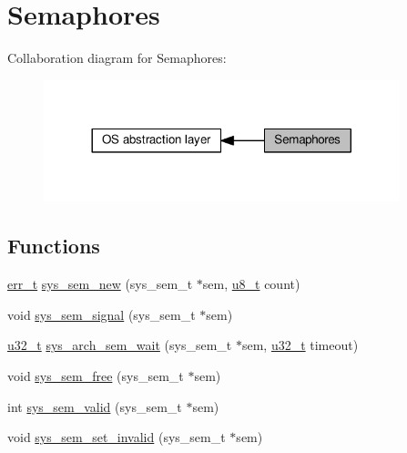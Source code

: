 \hypertarget{group__sys__sem}{}\section{Semaphores}
\label{group__sys__sem}
Collaboration diagram for Semaphores\+:
\nopagebreak
\begin{figure}[H]
\begin{center}
\leavevmode
\includegraphics[width=293pt]{group__sys__sem}
\end{center}
\end{figure}
\subsection*{Functions}
\begin{DoxyCompactItemize}
\item 
\hyperlink{group__infrastructure__errors_gaf02d9da80fd66b4f986d2c53d7231ddb}{err\+\_\+t} \hyperlink{group__sys__sem_gaf99da9e34a71855285c535183133dfde}{sys\+\_\+sem\+\_\+new} (sys\+\_\+sem\+\_\+t $\ast$sem, \hyperlink{group__compiler__abstraction_ga4caecabca98b43919dd11be1c0d4cd8e}{u8\+\_\+t} count)
\item 
void \hyperlink{group__sys__sem_gaaf800273061fcc3f8200fd4e1b9ca875}{sys\+\_\+sem\+\_\+signal} (sys\+\_\+sem\+\_\+t $\ast$sem)
\item 
\hyperlink{group__compiler__abstraction_ga4c14294869aceba3ef9d4c0c302d0f33}{u32\+\_\+t} \hyperlink{group__sys__sem_ga8d364c5037778acb21c3df675db81b4f}{sys\+\_\+arch\+\_\+sem\+\_\+wait} (sys\+\_\+sem\+\_\+t $\ast$sem, \hyperlink{group__compiler__abstraction_ga4c14294869aceba3ef9d4c0c302d0f33}{u32\+\_\+t} timeout)
\item 
void \hyperlink{group__sys__sem_ga83b781f96c30e915c752065a757da283}{sys\+\_\+sem\+\_\+free} (sys\+\_\+sem\+\_\+t $\ast$sem)
\item 
int \hyperlink{group__sys__sem_ga09a6c052ddaf799139efc56adfa087e4}{sys\+\_\+sem\+\_\+valid} (sys\+\_\+sem\+\_\+t $\ast$sem)
\item 
void \hyperlink{group__sys__sem_ga42a2ab32afbf41a4146a9d135224ef33}{sys\+\_\+sem\+\_\+set\+\_\+invalid} (sys\+\_\+sem\+\_\+t $\ast$sem)
\end{DoxyCompactItemize}


